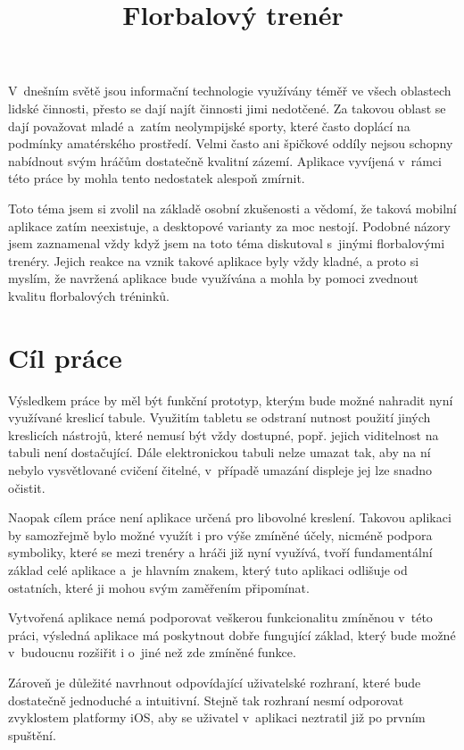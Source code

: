 \documentclass[thesis=B,czech]{FITthesis}[2012/06/26]
\title{Florbalový trenér}
\begin{document}

\begin{introduction}
	V~dnešním světě jsou informační technologie využívány téměř ve všech oblastech lidské činnosti, přesto se dají najít činnosti jimi nedotčené. Za takovou oblast se dají považovat mladé a~zatím neolympijské sporty, které často doplácí na podmínky amatérského prostředí. Velmi často ani špičkové oddíly nejsou schopny nabídnout svým hráčům dostatečně kvalitní zázemí. Aplikace vyvíjená v~rámci této práce by mohla tento nedostatek alespoň zmírnit.

	Toto téma jsem si zvolil na základě osobní zkušenosti a vědomí, že taková mobilní aplikace zatím neexistuje, a desktopové varianty za moc nestojí. Podobné názory jsem zaznamenal vždy když jsem na toto téma diskutoval s~jinými florbalovými trenéry. Jejich reakce na vznik takové aplikace byly vždy kladné, a proto si myslím, že navržená aplikace bude využívána a mohla by pomoci zvednout kvalitu florbalových tréninků.
\end{introduction}

\chapter{Cíl práce}
	Výsledkem práce by měl být funkční prototyp, kterým bude možné nahradit nyní využívané kreslicí tabule. Využitím tabletu se odstraní nutnost použití jiných kreslicích nástrojů, které nemusí být vždy dostupné, popř. jejich viditelnost na tabuli není dostačující. Dále elektronickou tabuli nelze umazat tak, aby na ní nebylo vysvětlované cvičení čitelné, v~případě umazání displeje jej lze snadno očistit.

	Naopak cílem práce není aplikace určená pro libovolné kreslení. Takovou aplikaci by samozřejmě bylo možné využít i pro výše zmíněné účely, nicméně podpora symboliky, které se mezi trenéry a hráči již nyní využívá, tvoří fundamentální základ celé aplikace a~je hlavním znakem, který tuto aplikaci odlišuje od ostatních, které ji mohou svým zaměřením připomínat.

	Vytvořená aplikace nemá podporovat veškerou funkcionalitu zmíněnou v~této práci, výsledná aplikace má poskytnout dobře fungující základ, který bude možné v~budoucnu rozšiřit i o~jiné než zde zmíněné funkce.

	Zároveň je důležité navrhnout odpovídající uživatelské rozhraní, které bude dostatečně jednoduché a intuitivní. Stejně tak rozhraní nesmí odporovat zvyklostem platformy iOS, aby se uživatel v~aplikaci neztratil již po prvním spuštění.
\end{document}
